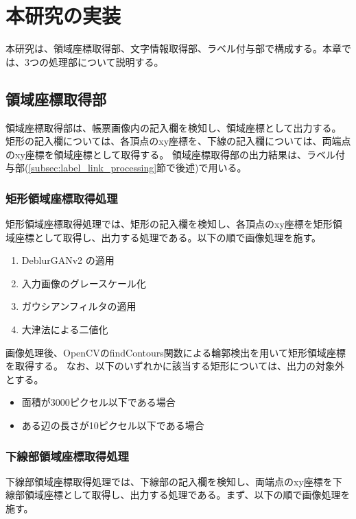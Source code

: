 \chapter{本研究の実装}\label{cha:Implementation}
本研究は、領域座標取得部、文字情報取得部、ラベル付与部で構成する。本章では、3つの処理部について説明する。


\section{領域座標取得部}\label{sec:area_coords_obtainment_part}
領域座標取得部は、帳票画像内の記入欄を検知し、領域座標として出力する。
矩形の記入欄については、各頂点のxy座標を、下線の記入欄については、両端点のxy座標を領域座標として取得する。
領域座標取得部の出力結果は、ラベル付与部(\ref{subsec:label_link_processing}節で後述)で用いる。


\subsection{矩形領域座標取得処理}\label{subsec:rect_coords_obtainment_processing}
矩形領域座標取得処理では、矩形の記入欄を検知し、各頂点のxy座標を矩形領域座標として取得し、出力する処理である。以下の順で画像処理を施す。

\begin{enumerate}
    \item DeblurGANv2 の適用
    \item 入力画像のグレースケール化
    \item ガウシアンフィルタの適用
    \item 大津法による二値化
\end{enumerate}

画像処理後、OpenCVのfindContours関数による輪郭検出を用いて矩形領域座標を取得する。
なお、以下のいずれかに該当する矩形については、出力の対象外とする。

\begin{itemize}
    \item 面積が3000ピクセル以下である場合
    \item ある辺の長さが10ピクセル以下である場合
\end{itemize}


\subsection{下線部領域座標取得処理}\label{subsec:underline_coords_obtainment_processing}
下線部領域座標取得処理では、下線部の記入欄を検知し、両端点のxy座標を下線部領域座標として取得し、出力する処理である。まず、以下の順で画像処理を施す。


